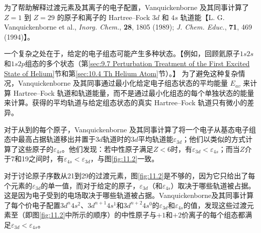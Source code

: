     为了帮助解释过渡元素及其离子的电子配置，Vanquickenborne 及其同事计算了 $Z=1$ 到 $Z=29$ 的原子和离子的 Hartree–Fock $3d$ 和 $4s$ 轨道能【L. G. Vanquickenborne et al., \textit{Inorg. Chem.}, \textbf{28}, 1805 (1989); \textit{J. Chem. Educ.}, \textbf{71}, 469 (1994)】。

    一个复杂之处在于，给定的电子组态可能产生多种状态。【例如，回顾氦原子$1s2s$和$1s2p$组态的多个状态（第\ref{sec:9.7 Perturbation Treatment of the First Excited State of Helium}节和第\ref{sec:10.4 Th Helium Atom}节）。】 为了避免这种复杂情况，Vanquickenborne 及其同事通过最小化给定电子组态状态的平均能量 $E_{av}$ 来计算 Hartree–Fock 轨道和轨道能量，而不是通过最小化组态的每个单独状态的能量来计算。获得的平均轨道与给定组态状态的真实 Hartree–Fock 轨道只有微小的差异。

    对于从到的每个原子，Vanquickenborne 及其同事计算了将一个电子从基态电子组态中最高占据轨道移出并置于$3d$轨道时的$3d$平均轨道能$\varepsilon_{3d}$；他们以类似的方式计算了这些原子的$\varepsilon_{4s}$。他们发现：若中性原子满足$Z<6$时，有$\varepsilon_{3d}<\varepsilon_{4s}$；而当$Z$介于7和19之间时，有$\varepsilon_{4s} < \varepsilon_{3d}$，与图\ref{fig:11.2}一致。

    对于讨论原子序数从21到29的过渡元素，图\ref{fig:11.2}是不够的，因为它只给出了每个元素的$\varepsilon_{3d}$的单一值，而对于给定的原子，$\varepsilon_{3d}$（和$\varepsilon_{4s}$）取决于哪些轨道被占据。这是因为电子受到的电场取决于哪些轨道被占据。Vanquickenborne及其同事计算了每个价电子配置$3d^n4s^2$、$3d^{n+1}4s^1$和$3d^{n+2}4s^0$的$\varepsilon_{3d}$和$\varepsilon_{4s}$的值，发现这些过渡元素至（即图\ref{fig:11.2}中所示的顺序）的中性原子与$+1$和$+2$价离子的每个组态都满足$\varepsilon_{3d} < \varepsilon_{4s}$。

